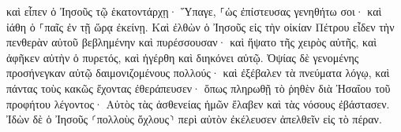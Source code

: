 \documentclass{openreader}
\begin{document}
καὶ εἶπεν ὁ Ἰησοῦς τῷ ἑκατοντάρχῃ· Ὕπαγε, ⸀ὡς ἐπίστευσας γενηθήτω σοι· καὶ ἰάθη ὁ ⸀παῖς ἐν τῇ ὥρᾳ ἐκείνῃ. 
Καὶ ἐλθὼν ὁ Ἰησοῦς εἰς τὴν οἰκίαν Πέτρου εἶδεν τὴν πενθερὰν αὐτοῦ βεβλημένην καὶ πυρέσσουσαν· 
καὶ ἥψατο τῆς χειρὸς αὐτῆς, καὶ ἀφῆκεν αὐτὴν ὁ πυρετός, καὶ ἠγέρθη καὶ διηκόνει αὐτῷ. 
Ὀψίας δὲ γενομένης προσήνεγκαν αὐτῷ δαιμονιζομένους πολλούς· καὶ ἐξέβαλεν τὰ πνεύματα λόγῳ, καὶ πάντας τοὺς κακῶς ἔχοντας ἐθεράπευσεν· 
ὅπως πληρωθῇ τὸ ῥηθὲν διὰ Ἠσαΐου τοῦ προφήτου λέγοντος· Αὐτὸς τὰς ἀσθενείας ἡμῶν ἔλαβεν καὶ τὰς νόσους ἐβάστασεν. 
Ἰδὼν δὲ ὁ Ἰησοῦς ⸂πολλοὺς ὄχλους⸃ περὶ αὐτὸν ἐκέλευσεν ἀπελθεῖν εἰς τὸ πέραν. 
\end{document}
